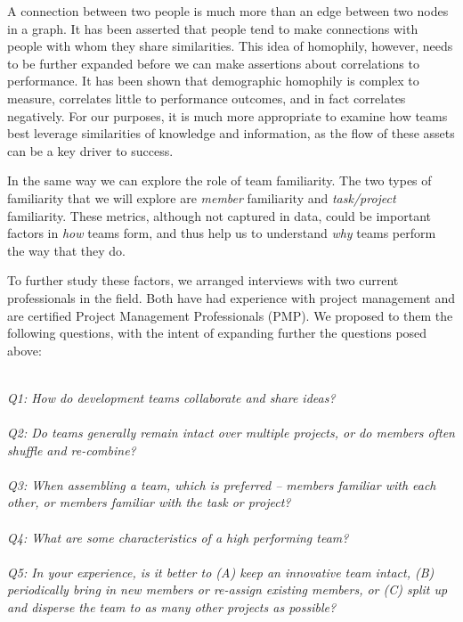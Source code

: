 \documentclass{proc}
\begin{document}
A connection between two people is much more than an edge between two nodes in a graph. It has been asserted that people tend to make connections with people with whom they share similarities\cite{mcpherson2001birds}. This idea of homophily, however, needs to be further expanded before we can make assertions about correlations to performance. It has been shown that demographic homophily is complex to measure, correlates little to performance outcomes, and in fact correlates negatively\cite{reagans2004make,lawrence1997perspective}. For our purposes, it is much more appropriate to examine how teams best leverage similarities of knowledge and information, as the flow of these assets can be a key driver to success\cite{nissen2002extended}.

In the same way we can explore the role of team familiarity. The two types of familiarity that we will explore are \textit{member} familiarity and \textit{task/project} familiarity\cite{harrison2003time}. These metrics, although not captured in data, could be important factors in \textit{how} teams form, and thus help us to understand \textit{why} teams perform the way that they do.

To further study these factors, we arranged interviews with two current professionals in the field. Both have had experience with project management and are certified Project Management Professionals (PMP\textregistered). We proposed to them the following questions, with the intent of expanding further the questions posed above:

\noindent\\\textit{Q1: How do development teams collaborate and share ideas?}\\
\noindent\\\textit{Q2: Do teams generally remain intact over multiple projects, or do members often shuffle and re-combine?}\\
\noindent\\\textit{Q3: When assembling a team, which is preferred -- members familiar with each other, or members familiar with the task or project?}\\
\noindent\\\textit{Q4: What are some characteristics of a high performing team?}\\
\noindent\\\textit{Q5: In your experience, is it better to (A) keep an innovative team intact, (B) periodically bring in new members or re-assign existing members, or (C) split up and disperse the team to as many other projects as possible?}\\
\end{document}
